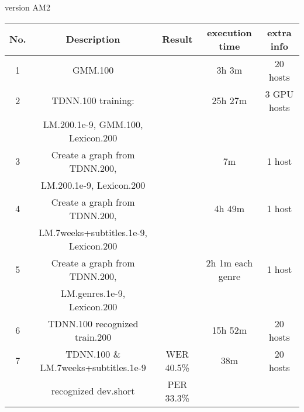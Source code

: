 version AM2
\begin{center}
\begin{tabular}{ | c | c | c | c |  c |  }
\hline
\textbf{No.} & \textbf{Description} & \textbf{Result} & \textbf{execution time} & \textbf{extra info} \\ \hline \hline
1 & GMM.100  &  & 3h 3m & 20 hosts \\  \hline

2 & TDNN.100 training: & & 25h 27m & 3 GPU hosts \\ 
 & LM.200.1e-9,  GMM.100, Lexicon.200 &  & & \\ \hline
 
3 & Create a graph from TDNN.200,  &  & 7m & 1 host \\  
 & LM.200.1e-9, Lexicon.200  & & & \\ \hline
 
4 & Create a graph from TDNN.200,  &   & 4h 49m & 1 host \\  
 & LM.7weeks+subtitles.1e-9, Lexicon.200  & & & \\ \hline

5 & Create a graph from TDNN.200,  &   & 2h 1m each genre & 1 host \\  
 & LM.genres.1e-9, Lexicon.200  & & & \\ \hline

6 & TDNN.100 recognized train.200 &  & 15h 52m & 20 hosts \\  \hline 

7 & TDNN.100 \& LM.7weeks+subtitles.1e-9 & WER 40.5\%   & 38m & 20 hosts \\  
&  recognized dev.short & PER 33.3\% & & \\ \hline
\end{tabular}
\end{center}





